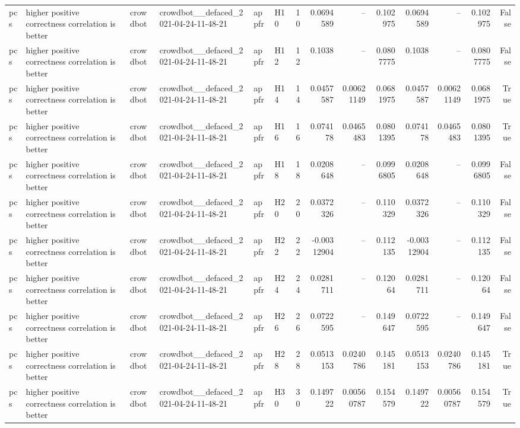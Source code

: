 \begin{longtable}{llllllrrrrrrrr}
pcs & higher positive correctness correlation is better & crowdbot & crowdbot\_\_defaced\_2021-04-24-11-48-21 & appfr & H10 & 10 & 0.0694589 & -- & 0.102975 & 0.0694589 & -- & 0.102975 & False \\
pcs & higher positive correctness correlation is better & crowdbot & crowdbot\_\_defaced\_2021-04-24-11-48-21 & appfr & H12 & 12 & 0.1038 & -- & 0.0807775 & 0.1038 & -- & 0.0807775 & False \\
pcs & higher positive correctness correlation is better & crowdbot & crowdbot\_\_defaced\_2021-04-24-11-48-21 & appfr & H14 & 14 & 0.0457587 & 0.00621149 & 0.0681975 & 0.0457587 & 0.00621149 & 0.0681975 & True \\
pcs & higher positive correctness correlation is better & crowdbot & crowdbot\_\_defaced\_2021-04-24-11-48-21 & appfr & H16 & 16 & 0.074178 & 0.0465483 & 0.0801395 & 0.074178 & 0.0465483 & 0.0801395 & True \\
pcs & higher positive correctness correlation is better & crowdbot & crowdbot\_\_defaced\_2021-04-24-11-48-21 & appfr & H18 & 18 & 0.0208648 & -- & 0.0996805 & 0.0208648 & -- & 0.0996805 & False \\
pcs & higher positive correctness correlation is better & crowdbot & crowdbot\_\_defaced\_2021-04-24-11-48-21 & appfr & H20 & 20 & 0.0372326 & -- & 0.110329 & 0.0372326 & -- & 0.110329 & False \\
pcs & higher positive correctness correlation is better & crowdbot & crowdbot\_\_defaced\_2021-04-24-11-48-21 & appfr & H22 & 22 & -0.00312904 & -- & 0.112135 & -0.00312904 & -- & 0.112135 & False \\
pcs & higher positive correctness correlation is better & crowdbot & crowdbot\_\_defaced\_2021-04-24-11-48-21 & appfr & H24 & 24 & 0.0281711 & -- & 0.12064 & 0.0281711 & -- & 0.12064 & False \\
pcs & higher positive correctness correlation is better & crowdbot & crowdbot\_\_defaced\_2021-04-24-11-48-21 & appfr & H26 & 26 & 0.0722595 & -- & 0.149647 & 0.0722595 & -- & 0.149647 & False \\
pcs & higher positive correctness correlation is better & crowdbot & crowdbot\_\_defaced\_2021-04-24-11-48-21 & appfr & H28 & 28 & 0.0513153 & 0.0240786 & 0.145181 & 0.0513153 & 0.0240786 & 0.145181 & True \\
pcs & higher positive correctness correlation is better & crowdbot & crowdbot\_\_defaced\_2021-04-24-11-48-21 & appfr & H30 & 30 & 0.149722 & 0.00560787 & 0.154579 & 0.149722 & 0.00560787 & 0.154579 & True \\

\end{longtable}
